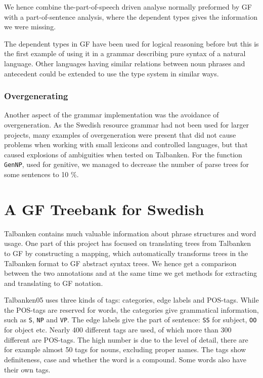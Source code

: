 \documentclass[runningheads,a4paper]{llncs}
\begin{document}
We hence combine the-part-of-speech driven analyse normally preformed by
GF with a part-of-sentence analysis, where the dependent types gives the 
information we were missing.

The dependent types in GF have been used for logical reasoning before but this 
is the first example of using it in a grammar describing pure syntax of
a natural language. Other languages having similar relations between 
noun phrases and antecedent could be extended to use the type system in similar
ways.

\subsubsection{Overgenerating}
Another aspect of the grammar implementation was the avoidance of overgeneration. As
the Swedish resource grammar had not been used for larger projects, many examples of
overgeneration were present that did not cause problems when working with small
lexicons and controlled languages, but that caused explosions of ambiguities when 
tested on Talbanken. For the function \verb-GenNP-, used for genitive, we managed
to decrease the number of parse trees for some sentences to 10 \%.


\section{A GF Treebank for Swedish}
\label{sec:mapping}

Talbanken contains much valuable information about phrase structures and word 
usage. One part of this project has focused on translating trees from Talbanken to GF
by constructing a mapping, which automatically transforms trees in the
Talbanken format to GF abstract syntax trees.
We hence get a comparison between the two annotations and at the same time
we get methods for extracting and translating to GF notation. 

Talbanken05 uses three kinds of tags: categories, edge labels and POS-tags. 
While the POS-tags are reserved for words, the categories give grammatical information,
such as \verb|S|, \verb|NP| and \verb|VP|.
The edge labels give the
part of sentence: \verb|SS| for subject, 
\verb|OO| for object etc. Nearly 400 different tags are used, of which more than
300 different are POS-tags. The high number is due to the level of detail,  there are for
example almost 50 tags for nouns, excluding proper names. The tags
show definiteness, case and whether the word is a compound. Some words also have
their own tags.\\
\end{document}
